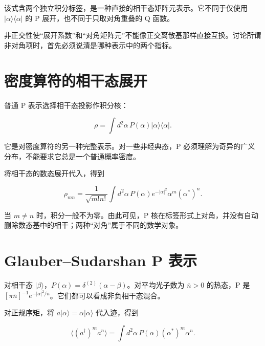 \documentclass[UTF8,a4paper,zihao=-4,openany,fontset=fandol]{ctexbook}
\begin{document}
该式含两个独立积分标签，是一种直接的相干态矩阵元表示。它不同于仅使用 $|\alpha\rangle\langle\alpha|$ 的 P 展开，也不同于只取对角重叠的 Q 函数。



非正交性使“展开系数”和“对角矩阵元”不能像正交离散基那样直接互换。讨论所谓非对角项时，首先必须说清是哪种表示中的两个指标。



\section{密度算符的相干态展开}\label{sec:09:3}


普通 P 表示选择相干态投影作积分核：



\begin{equation*}
\rho=\int d^2\alpha\,P(\alpha)|\alpha\rangle\langle\alpha|.
\tag{9.2}\label{eq:9.2}
\end{equation*}


它是对密度算符的另一种完整表示。对一些非经典态，P 必须理解为奇异的广义分布，不能要求它总是一个普通概率密度。



将相干态的数态展开代入，得到



\begin{equation*}
\rho_{mn}=\frac1{\sqrt{m!n!}}
\int d^2\alpha\,P(\alpha)e^{-|\alpha|^2}
\alpha^m(\alpha^*)^n.
\tag{9.3}\label{eq:9.3}
\end{equation*}


当 $m\ne n$ 时，积分一般不为零。由此可见，P 核在标签形式上对角，并没有自动删除数态基中的相干；两种“对角”属于不同的数学对象。



\section{Glauber–Sudarshan P 表示}\label{sec:09:4}


对相干态 $|\beta\rangle$，$P(\alpha)=\delta^{(2)}(\alpha-\beta)$。对平均光子数为 $\bar n>0$ 的热态，P 是 $[\pi\bar n]^{-1}e^{-|\alpha|^2/\bar n}$。它们都可以看成非负相干态混合。



对正规序矩，将 $a|\alpha\rangle=\alpha|\alpha\rangle$ 代入迹，得到



\begin{equation*}
\langle(a^\dagger)^ma^n\rangle
=\int d^2\alpha\,P(\alpha)(\alpha^*)^m\alpha^n.
\tag{9.4}\label{eq:9.4}
\end{equation*}
\end{document}

